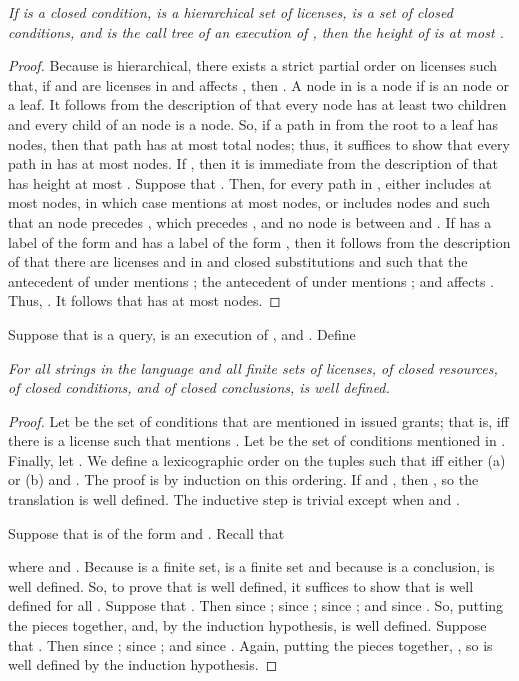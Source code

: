 \documentclass{acmtrans2m}
\newcommand{\dfn}{\begin{definition}}
\newcommand{\prf}{\begin{proof}}
\newcommand{\edfn}{\bbox\end{definition}}
\newcommand{\eprf}{\end{proof}}
\newcommand{\wbox}{\mbox{\llap{}}}
\newcommand{\bbox}{\wbox}
\newenvironment{RETHM}[2]{\trivlist \item[\hskip 10pt\hskip\labelsep{\sc #1\hskip 5pt\relax\ref{#2}.}]\it}{\endtrivlist}
\newcommand{\rethm}[1]{\begin{RETHM}{Theorem}{#1}}
\newcommand{\repro}[1]{\begin{RETHM}{Proposition}{#1}}
\newcommand{\erethm}{\end{RETHM}}
\newcommand{\erepro}{\end{RETHM}}
\newcommand{\othm}{\rethm}
\newcommand{\eothm}{\erethm}
\newcommand{\opro}{\repro}
\newcommand{\eopro}{\erepro}
\newcommand{\<}{
}
\renewcommand{\>}{\rangle}
\begin{document}
\opro{p:fixExB}
If  is a closed condition,  is a hierarchical set of licenses,  is a set
of closed  conditions, and  is the call tree of an execution of
, then the height of  is at most .
\eopro
\prf
Because  is hierarchical, there exists a strict partial order  on licenses
such that, if  and  are licenses in  and  affects , then
.  A node  in  is a \emph{} node if  is an 
node or a leaf.  It follows from the description of  that every 
node has at least two children and every child of an  node is a  node.
So, if a path in  from the root to a leaf has   nodes, then that path
has at most  total nodes; thus, it suffices to show that every path in  has at
most   nodes.  If , then it is immediate from the
description of  that  has height at most .  Suppose that .
Then, for every path  in , either  includes at most   nodes, in
which case  mentions at most   nodes, or  includes 
 nodes  and  such that an  node precedes , which precedes
, and no  node is between  and .  If  has a label of the form
 and  has a label of the form ,
then it follows from the description of  that there are licenses 
and  in  and closed substitutions  and  such that the
antecedent of  under  mentions ; the antecedent of  under
 mentions ; and  affects .  Thus,
.  It follows that  has at most  
nodes.
\eprf

\dfn
Suppose that  is a query,
 is an execution of , and
.
Define

\edfn

\othm{t:trans1}
For all strings  in the language and all finite sets  of licenses,  of closed
resources,  of closed  conditions, and  of closed conclusions,
 is well defined.
\eothm
\prf
Let  be the set of  conditions that are mentioned in issued grants; that is,
 iff there is a license  such that  mentions
.  Let  be the set of  conditions mentioned in .  Finally,
let .  We define a lexicographic order on the tuples 
such that  iff either (a)  or
(b)  and .  The proof is by
induction on this ordering.  If  and , then
, so the translation is well defined.  The inductive step is trivial
except when  and .

Suppose that  is of the form  and .  Recall that

where  and
.  Because  is a finite set,  is a finite set
and because  is a conclusion,  is well
defined.  So, to prove that  is well defined, it suffices to
show that  is well defined for all .
Suppose that .  Then  since
;  since ;
 since ; and
 since .  So, putting
the pieces together,  and, by the induction
hypothesis,  is well defined.
Suppose that .  Then  since
;  since ; and
 since .  Again, putting the pieces
together, , so
 is well defined by the induction hypothesis.
\eprf
\end{document}
